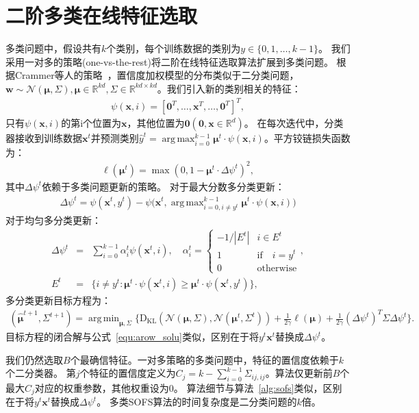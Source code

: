 \documentclass[doctor]{ustcthesis}
\def \w  {\mathbf{w}}
\def \x {\mathbf{x}}
\def \zero {\mathbf{0}}
\DeclareMathOperator*{\argmax}{arg\,max}
\DeclareMathOperator*{\argmin}{arg\,min}
\def \R {\mathbb{R}}
\def \Mu {\pmb{\mu}}
\def \Nn {\mathcal{N}}
\def \DKL   {\mathrm{D_{KL}}}
\begin{document}
\section{二阶多类在线特征选取}\label{ssec:smofs}
多类问题中，假设共有$k$个类别，每个训练数据的类别为$y\in\{0,1,\ldots,k-1\}$。
我们采用一对多的策略(one-vs-the-rest)将二阶在线特征选取算法扩展到多类问题。
根据Crammer等人的策略~\cite{crammer2009multi}，置信度加权模型的分布类似于二分类问题，
$\w\sim\Nn(\Mu,\Sigma), \Mu \in \R^{kd}, \Sigma\in\R^{kd\times
kd}$。我们引入新的类别相关的特征：
\begin{eqnarray*}
    \psi(\x,i) = [\zero^T,\ldots,\x^T,\ldots,\zero^T]^T,
\end{eqnarray*}
只有$\psi(\x,i)$的第i个位置为$\x$，其他位置为$\zero(\zero, \x \in \R^d)$。
在每次迭代中，分类器接收到训练数据$\x^t$并预测类别$\hat{y}^t =
\argmax_{i=0}^{k-1}{\Mu^t \cdot \psi(\x,i)}$。平方铰链损失函数为：
\begin{eqnarray}
    \ell(\Mu^t) = \max(0,1 - \Mu^t \cdot \Delta\psi^t)^2,
\end{eqnarray}
其中$\Delta\psi^t$依赖于多类问题更新的策略。
对于最大分数多分类更新：
\begin{eqnarray}
    \Delta\psi^t = \psi(\x^t,y^t) - \psi(\x^t,\argmax_{i=0,i \neq y^t}^{k-1}{\Mu^t
    \cdot \psi(\x,i))}
\end{eqnarray}
对于均匀多分类更新：
\begin{eqnarray}
    \Delta\psi^t &=& \sum_{i=0}^{k-1}\alpha^{t}_{i}\psi(\x^t,i), \quad
    \alpha^{t}_{i} =
    \begin{cases}
        -1 / |E^t|& i\in E^t\\
        1 & \text{if}\quad i = y^t\\
        0 & \text{otherwise}
    \end{cases}, \\
    E^t &=& \{i \neq y^t: \Mu^t \cdot \psi(\x^t, i)\geq \Mu^t \cdot \psi(\x^t,y^t)\},
\end{eqnarray}
多分类更新目标方程为：
\small
\begin{eqnarray}
    (\hat{\Mu}^{t+1},\Sigma^{t+1}) =
    \argmin_{\Mu,\Sigma}\big\{\DKL(\Nn(\Mu,\Sigma),
    \Nn(\Mu^t,\Sigma^t)) + \frac{1}{2\gamma}\ell(\Mu) +
    \frac{1}{2\gamma}(\Delta\psi^t)^T\Sigma\Delta\psi^t\big\}.
    \label{equ:multi_arow_obj}
\end{eqnarray}
\normalsize
目标方程的闭合解与公式~\eqref{equ:arow_solu}类似，区别在于将$y^t\x^t$替换成$\Delta\psi^t$。

我们仍然选取$B$个最确信特征。一对多策略的多类问题中，特征的置信度依赖于$k$个二分类器。
第$j$个特征的置信度定义为$C_j = k -
\sum_{i=0}^{k-1}\Sigma_{ij,ij}$。算法仅更新前$B$个最大$C_j$对应的权重参数，其他权重设为$0$。
算法细节与算法~\ref{alg:sofs}类似，区别在于将$y^t\x^t$替换成$\Delta\psi^t$。
多类SOFS算法的时间复杂度是二分类问题的$k$倍。
\end{document}
